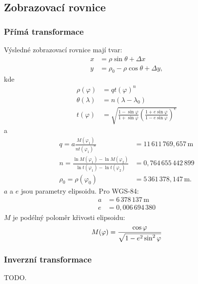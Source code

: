 \documentclass[a4paper]{article}
\begin{document}
\subsection{Zobrazovací rovnice}
\subsubsection{Přímá transformace}
Výsledné zobrazovací rovnice mají tvar:
\begin{align*}
x &= \rho \sin{\theta} + \Delta x\\
y &= \rho_0 - \rho \cos{\theta} + \Delta y,
\end{align*}
kde
\begin{align*}
\rho(\varphi) &= q t(\varphi)^n\\
\theta(\lambda) &= n (\lambda - \lambda_0)\\
t(\varphi) &= \sqrt{\frac{1-\sin{\varphi}}{1+\sin{\varphi}}\left(\frac{1+e\sin{\varphi}}{1-e\sin{\varphi}}\right)^e}
\end{align*}
a
\begin{align*}
q = a \frac{M(\varphi_1)}{n t(\varphi_1)^n} &= 11\,611\,769,657\,\mathrm{m}\\
n = \frac{\ln{M(\varphi_1)} - \ln{M(\varphi_2)}}{\ln{t(\varphi_1)} - \ln{t(\varphi_2)}} &= 0,764\,655\,442\,899\\
\rho_0 = \rho(\varphi_0) &= 5\,361\,378,147\,\mathrm{m}.
\end{align*}
$a$ a $e$ jsou parametry elipsoidu. Pro WGS-84:
\begin{align*}
a &= 6\,378\,137\,\mathrm{m}\\
e &= 0,006\,694\,380
\end{align*}
$M$ je podélný poloměr křivosti elipsoidu:
\begin{equation*}
M(\varphi) = \frac{\cos{\varphi}}{\sqrt{1 - e^2 \sin^2{\varphi}}}\\
\end{equation*}

  
\subsubsection{Inverzní transformace}
TODO.
\end{document}
